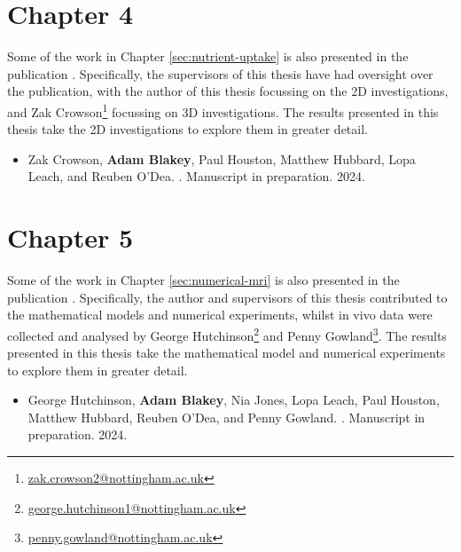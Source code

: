 \documentclass[a4paper, 12pt, oneside, colorinlistoftodos]{book}
\begin{document}
        \section*{Chapter 4}
            Some of the work in Chapter \ref{sec:nutrient-uptake} is also presented in the publication \cite{crowsonInvestigatingPlacentalHemodynamics2024}. Specifically, the supervisors of this thesis have had oversight over the publication, with the author of this thesis focussing on the 2D investigations, and Zak Crowson\footnote{\href{mailto:zak.crowson2@nottingham.ac.uk}{zak.crowson2@nottingham.ac.uk}} focussing on 3D investigations. The results presented in this thesis take the 2D investigations to explore them in greater detail.

            \begin{itemize}
                \item[\cite{crowsonInvestigatingPlacentalHemodynamics2024}] Zak Crowson, \textbf{Adam Blakey}, Paul Houston, Matthew Hubbard, Lopa Leach, and Reuben O'Dea. . Manuscript in preparation. 2024.
            \end{itemize}

        \section*{Chapter 5}
            Some of the work in Chapter \ref{sec:numerical-mri} is also presented in the publication \cite{hutchinsonEffectsMaternalFlow2024}. Specifically, the author and supervisors of this thesis contributed to the mathematical models and numerical experiments, whilst in vivo data were collected and analysed by George Hutchinson\footnote{\href{mailto:george.hutchinson1@nottingham.ac.uk}{george.hutchinson1@nottingham.ac.uk}} and Penny Gowland\footnote{\href{mailto:penny.gowland@nottingham.ac.uk}{penny.gowland@nottingham.ac.uk}}. The results presented in this thesis take the mathematical model and numerical experiments to explore them in greater detail.

            \begin{itemize}
                \item[\cite{hutchinsonEffectsMaternalFlow2024}] George Hutchinson, \textbf{Adam Blakey}, Nia Jones, Lopa Leach, Paul Houston, Matthew Hubbard, Reuben O'Dea, and Penny Gowland. . Manuscript in preparation. 2024.
            \end{itemize}
\end{document}
